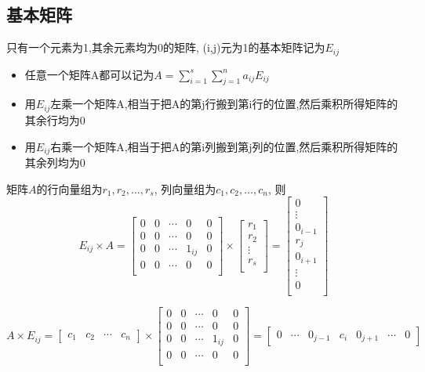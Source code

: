 \documentclass{book}
\begin{document}
\subsection{基本矩阵}
只有一个元素为1,其余元素均为0的矩阵, (i,j)元为1的基本矩阵记为$E_{ij}$
\begin{itemize}
\item 任意一个矩阵A都可以记为$A=\sum_{i=1}^s {\sum_{j=1}^n {a_{ij}E_{ij}}}$
\item 用$E_{ij}$左乘一个矩阵A,相当于把A的第j行搬到第i行的位置,然后乘积所得矩阵的其余行均为0
\item 用$E_{ij}$右乘一个矩阵A,相当于把A的第i列搬到第j列的位置,然后乘积所得矩阵的其余列均为0
\end{itemize}

矩阵$A$的行向量组为$r_1, r_2, \ldots, r_s$, 列向量组为$c_1, c_2, \ldots, c_n$, 则
$$
E_{ij} \times A
=
\begin{bmatrix}
	0 & 0 & \cdots & 0 & 0 \\
	0 & 0 & \cdots & 0 & 0 \\
	0 & 0 & \cdots & 1_{ij} & 0\\
	0 & 0 & \cdots & 0 & 0\\
\end{bmatrix}
\times
\begin{bmatrix}
	r_1 \\
	r_2 \\
	\vdots \\
	r_s \\
\end{bmatrix}
=
\begin{bmatrix}
	0 \\
	\vdots \\
	0_{i - 1} \\
	r_j \\
	0_{i + 1} \\
	\vdots \\
	0 \\
\end{bmatrix}
$$

$$
A \times E_{ij}
=
\begin{bmatrix}
	c_1 & c_2 & \cdots & c_n
\end{bmatrix}
\times
\begin{bmatrix}
	0 & 0 & \cdots & 0 & 0 \\
	0 & 0 & \cdots & 0 & 0 \\
	0 & 0 & \cdots & 1_{ij} & 0\\
	0 & 0 & \cdots & 0 & 0\\
\end{bmatrix}
=
\begin{bmatrix}
	0 & \cdots & 0_{j - 1} & c_i & 0_{j + 1} & \cdots & 0
\end{bmatrix}
$$
\end{document}
